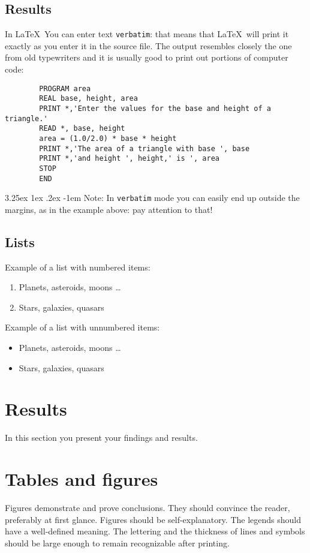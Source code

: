 \documentclass[a4paper,10pt]{article}
\makeatletter
\renewcommand\paragraph{\@startsection{paragraph}{5}{\z@}%
  {3.25ex \@plus1ex \@minus.2ex}%
  {-1em}%
  {\normalfont\normalsize\bfseries}}
\makeatother
\begin{document}
\subsection{Results}
In \LaTeX\, You can enter text \texttt{verbatim}: that means that
\LaTeX\, will print it exactly as you enter it in the source file. The
output resembles closely the one from old typewriters and it
is usually good to print out portions of computer code:

\begin{verbatim}
        PROGRAM area
        REAL base, height, area
        PRINT *,'Enter the values for the base and height of a triangle.'
        READ *, base, height
        area = (1.0/2.0) * base * height
        PRINT *,'The area of a triangle with base ', base
        PRINT *,'and height ', height,' is ', area
        STOP
        END
\end{verbatim}

\paragraph{Note:}
In \texttt{verbatim} mode you can easily end up outside the
margins, as in the example above: pay attention to that!

\subsection{Lists}
Example of a list with numbered items:

\begin{enumerate}
   \item  Planets, asteroids, moons \ldots
   \item  Stars, galaxies, quasars
\end{enumerate}

Example of a list with unnumbered items:

\begin{itemize}
   \item  Planets, asteroids, moons \ldots
   \item  Stars, galaxies, quasars

\end{itemize}

\section{Results}
In this section you present your findings and results.


\newpage
\section{Tables and figures}
Figures demonstrate and prove conclusions. They should convince
the reader, preferably at first glance. Figures should be self-explanatory.
The legends should have a well-defined meaning. The lettering and the
thickness of lines and symbols should be large enough to remain recognizable
after printing.
\end{document}
